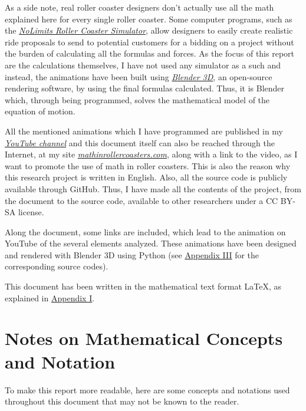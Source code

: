 \documentclass[12pt,twoside,a4paper]{article}
\begin{document}
	As a side note, real roller coaster designers don't actually use all the math explained here for every single roller coaster. Some computer programs, such as the \href{https://www.nolimitscoaster.com/}{\textit{NoLimits Roller Coaster Simulator}}, allow designers to easily create realistic ride proposals to send to potential customers for a bidding on a project without the burden of calculating all the formulas and forces. As the focus of this report are the calculations themselves, I have not used any simulator as a such and instead, the animations have been built using \href{https://www.blender.org/}{\textit{Blender 3D}}, an open-source rendering software, by using the final formulas calculated. Thus, it is Blender which, through being programmed, solves the mathematical model of the equation of motion.
		
	All the mentioned animations which I have programmed are published in my \href{https://www.youtube.com/@arnaudelrio}{\textit{YouTube channel}} and this document itself can also be reached through the Internet, at my site \href{https://mathinrollercoasters.com/}{\textit{mathinrollercoasters.com}}, along with a link to the video, as I want to promote the use of math in roller coasters. This is also the reason why this research project is written in English. Also, all the source code is publicly available through GitHub. Thus, I have made all the contents of the project, from the document to the source code, available to other researchers under a CC BY-SA license.
	
	Along the document, some links are included, which lead to the animation on YouTube of the several elements analyzed. These animations have been designed and rendered with Blender 3D using Python (see \hyperref[sec:Appendix III]{Appendix III} for the corresponding source codes).
	
	This document has been written in the mathematical text format \LaTeX, as explained in \hyperref[sec:Appendix I]{Appendix I}.
	
	\cleardoublepage
	
	\section{Notes on Mathematical Concepts and Notation}
	To make this report more readable, here are some concepts and notations used throughout this document that may not be known to the reader.
	
\end{document}
